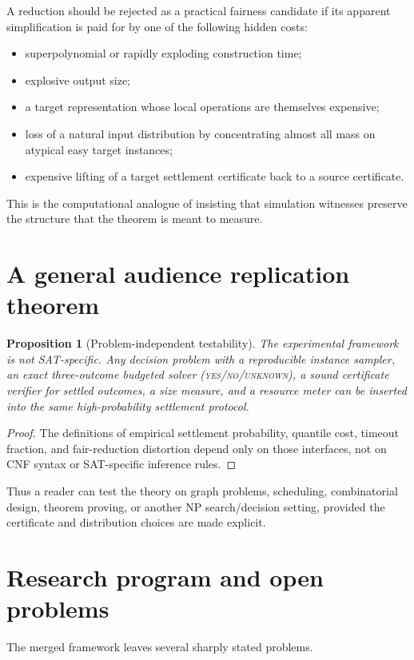 \documentclass[11pt]{article}
\newtheorem{proposition}[theorem]{Proposition}
\theoremstyle{definition}
\begin{document}
A reduction should be rejected as a practical fairness candidate if its apparent simplification is paid for by one of the following hidden costs:
\begin{itemize}
    \item superpolynomial or rapidly exploding construction time;
    \item explosive output size;
    \item a target representation whose local operations are themselves expensive;
    \item loss of a natural input distribution by concentrating almost all mass on atypical easy target instances;
    \item expensive lifting of a target settlement certificate back to a source certificate.
\end{itemize}

This is the computational analogue of insisting that simulation witnesses preserve the structure that the theorem is meant to measure.

\section{A general audience replication theorem}
\begin{proposition}[Problem-independent testability]
The experimental framework is not SAT-specific. Any decision problem with a reproducible instance sampler, an exact three-outcome budgeted solver (\textnormal{\textsc{yes}}/\textnormal{\textsc{no}}/\textnormal{\textsc{unknown}}), a sound certificate verifier for settled outcomes, a size measure, and a resource meter can be inserted into the same high-probability settlement protocol.
\end{proposition}

\begin{proof}
The definitions of empirical settlement probability, quantile cost, timeout fraction, and fair-reduction distortion depend only on those interfaces, not on CNF syntax or SAT-specific inference rules.
\end{proof}

Thus a reader can test the theory on graph problems, scheduling, combinatorial design, theorem proving, or another NP search/decision setting, provided the certificate and distribution choices are made explicit.

\section{Research program and open problems}
The merged framework leaves several sharply stated problems.
\end{document}
